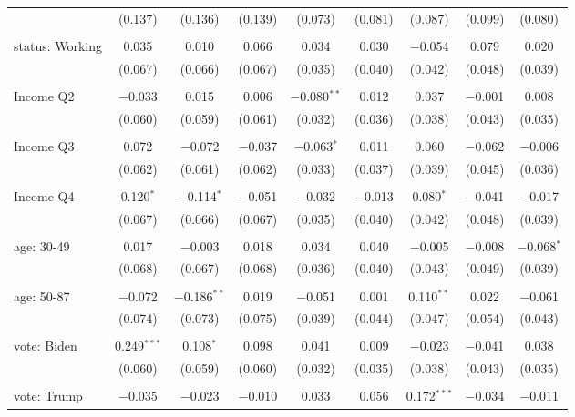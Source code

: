 \begin{tabular}{@{\extracolsep{5pt}}lcccccccc}
  & (0.137) & (0.136) & (0.139) & (0.073) & (0.081) & (0.087) & (0.099) & (0.080) \\ 
  & & & & & & & & \\ 
 status: Working & 0.035 & 0.010 & 0.066 & 0.034 & 0.030 & $-$0.054 & 0.079 & 0.020 \\ 
  & (0.067) & (0.066) & (0.067) & (0.035) & (0.040) & (0.042) & (0.048) & (0.039) \\ 
  & & & & & & & & \\ 
 Income Q2 & $-$0.033 & 0.015 & 0.006 & $-$0.080$^{**}$ & 0.012 & 0.037 & $-$0.001 & 0.008 \\ 
  & (0.060) & (0.059) & (0.061) & (0.032) & (0.036) & (0.038) & (0.043) & (0.035) \\ 
  & & & & & & & & \\ 
 Income Q3 & 0.072 & $-$0.072 & $-$0.037 & $-$0.063$^{*}$ & 0.011 & 0.060 & $-$0.062 & $-$0.006 \\ 
  & (0.062) & (0.061) & (0.062) & (0.033) & (0.037) & (0.039) & (0.045) & (0.036) \\ 
  & & & & & & & & \\ 
 Income Q4 & 0.120$^{*}$ & $-$0.114$^{*}$ & $-$0.051 & $-$0.032 & $-$0.013 & 0.080$^{*}$ & $-$0.041 & $-$0.017 \\ 
  & (0.067) & (0.066) & (0.067) & (0.035) & (0.040) & (0.042) & (0.048) & (0.039) \\ 
  & & & & & & & & \\ 
 age: 30-49 & 0.017 & $-$0.003 & 0.018 & 0.034 & 0.040 & $-$0.005 & $-$0.008 & $-$0.068$^{*}$ \\ 
  & (0.068) & (0.067) & (0.068) & (0.036) & (0.040) & (0.043) & (0.049) & (0.039) \\ 
  & & & & & & & & \\ 
 age: 50-87 & $-$0.072 & $-$0.186$^{**}$ & 0.019 & $-$0.051 & 0.001 & 0.110$^{**}$ & 0.022 & $-$0.061 \\ 
  & (0.074) & (0.073) & (0.075) & (0.039) & (0.044) & (0.047) & (0.054) & (0.043) \\ 
  & & & & & & & & \\ 
 vote: Biden & 0.249$^{***}$ & 0.108$^{*}$ & 0.098 & 0.041 & 0.009 & $-$0.023 & $-$0.041 & 0.038 \\ 
  & (0.060) & (0.059) & (0.060) & (0.032) & (0.035) & (0.038) & (0.043) & (0.035) \\ 
  & & & & & & & & \\ 
 vote: Trump & $-$0.035 & $-$0.023 & $-$0.010 & 0.033 & 0.056 & 0.172$^{***}$ & $-$0.034 & $-$0.011 \\ 

\end{tabular}
